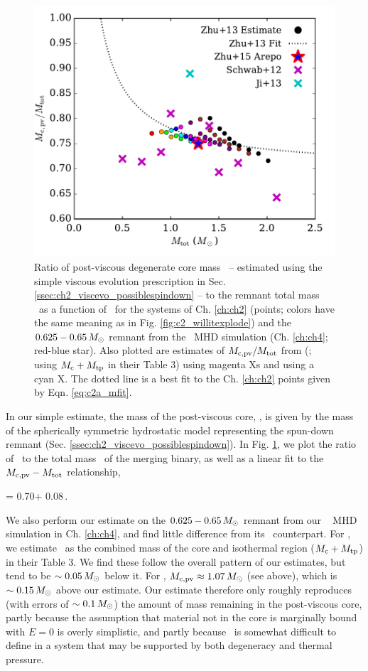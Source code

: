 
\begin{figure}
\centering
\includegraphics[angle=0,width=0.6\columnwidth]{chapter2_zhu+13/figures/c2a_mcpv.pdf}
\caption{Ratio of post-viscous degenerate core mass \Mcpv\ -- estimated using the simple viscous evolution prescription in Sec. \ref{ssec:ch2_viscevo_possiblespindown} -- to the remnant total mass \Mtot\ as a function of \Mtot\ for the systems of Ch. \ref{ch:ch2} (points; colors have the same meaning as in Fig. \ref{fig:c2_willitexplode}) and the $0.625 - 0.65\,\Msun$ remnant from the \arepo\ MHD simulation (Ch. \ref{ch:ch4}; red-blue star).  Also plotted are estimates of $\Mcpv/\Mtot$ from \citeauthor{schw+12} (\citeyear{schw+12}; using $M_\mathrm{c} + M_\mathrm{tp}$ in their Table 3) using magenta Xs and \cite{ji+13} using a cyan X.  The dotted line is a best fit to the Ch. \ref{ch:ch2} points given by Eqn. \ref{eq:c2a_mfit}.}
\label{fig:c2a_mcpvvsmtot}
\end{figure}

In our simple estimate, the mass of the post-viscous core, \Mcpv, is given by the mass of the spherically symmetric hydrostatic model representing the spun-down remnant (Sec. \ref{ssec:ch2_viscevo_possiblespindown}).  In Fig. \ref{fig:c2a_mcpvvsmtot}, we plot the ratio of \Mcpv\ to the total mass \Mtot\ of the merging binary, as well as a linear fit to the $\Mcpv-\Mtot$ relationship,

\eqbegin
\Mcpv = 0.70\Mtot + 0.08\,\Msun.
\label{eq:c2a_mfit}
\eqend

\noindent  We also perform our estimate on the $0.625 - 0.65\,\Msun$ remnant from our \arepo\ \citep{spri10} MHD simulation in Ch. \ref{ch:ch4}, and find little difference from its \gasoline\ counterpart.  For \cite{schw+12}, we estimate \Mcpv\ as the combined mass of the core and isothermal region ($M_\mathrm{c} + M_\mathrm{tp}$) in their Table 3.  We find these follow the overall pattern of our estimates, but tend to be $\sim0.05\,\Msun$ below it.  For \cite{ji+13}, $\Mcpv \approx 1.07\,\Msun$ (see above), which is $\sim0.15\,\Msun$ above our estimate.  Our estimate therefore only roughly reproduces (with errors of $\sim0.1\,\Msun$) the amount of mass remaining in the post-viscous core, partly because the assumption that material not in the core is marginally bound with $E = 0$ is overly simplistic, and partly because \Mcpv\ is somewhat difficult to define in a system that may be supported by both degeneracy and thermal pressure.

